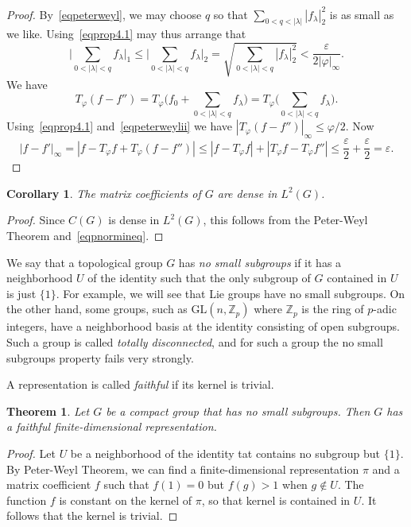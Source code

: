 \documentclass[12pt,reqno]{book}%
\newtheorem{theorem}{Theorem}[chapter]
\newtheorem{corollary}{Corollary}[chapter]
\theoremstyle{definition}
\theoremstyle{remark}
\theoremstyle{theorem}
\theoremstyle{remark}
\begin{document}
\begin{proof}
    By~\eqref{eqpeterweyl}, we may choose $q$ so that $\sum_{0 < q < |\lambda|} |f_\lambda|_{2}^{2}$ is as small as we like.
    Using~\eqref{eqprop4.1} may thus arrange that
    \begin{equation}\label{eqpeterweylii}
        \Bigg|\sum_{0 < |\lambda| < q} f_\lambda\Bigg|_1 \leq \Bigg|\sum_{0 < |\lambda| < q} f_\lambda \Bigg|_2 = \sqrt{\sum_{0 < |\lambda| < q} |f_\lambda|_{2}^{2}} < \frac{\varepsilon}{2|\varphi|_\infty}.
    \end{equation}
    We have
    \[
        T_\varphi(f - f'') = T_\varphi \Bigg(f_0 + \sum_{0 < |\lambda| < q} f_\lambda \Bigg) = T_\varphi \Bigg(\sum_{0 < |\lambda| < q} f_\lambda \Bigg).
    \]
    Using~\eqref{eqprop4.1} and~\eqref{eqpeterweylii} we have $|T_\varphi(f - f'')|_\infty \leq \varphi/2$.
    Now
    \[
        |f - f'|_\infty = |f - T_\varphi f + T_\varphi(f - f'')| \leq |f - T_\varphi f| + |T_\varphi f - T_\varphi f''| \leq \frac{\varepsilon}{2} + \frac{\varepsilon}{2} = \varepsilon.
    \]
\end{proof}%

\begin{corollary}\label{cor4.1}%
    The matrix  coefficients of $G$ are dense in $L^2(G)$.
\end{corollary}%
\begin{proof}%
    Since $C(G)$ is dense in $L^2(G)$, this follows from the Peter-Weyl Theorem and~\eqref{eqpnormineq}.
\end{proof}%

We say that a topological group $G$ has \emph{no small subgroups} if it has a neighborhood $U$ of the identity such that the only subgroup of $G$ contained in $U$ is just $\{1\}$.
For example, we will see that Lie groups have no small subgroups.
On the other hand, some groups, such as $\mathrm{GL}(n, \mathbb{Z}_p)$ where $\mathbb{Z}_p$ is the ring of $p$-adic integers, have a neighborhood basis at the identity consisting of open subgroups.
Such a group is called \emph{totally disconnected}, and for such a group the no small subgroups property fails very strongly.

A representation is called \emph{faithful} if its kernel is trivial.

\begin{theorem}\label{thm4.2}%
    Let $G$ be a compact group that has no small subgroups.
    Then $G$ has a faithful finite-dimensional representation.
\end{theorem}%
\begin{proof}%
    Let $U$ be a neighborhood of the identity tat contains no subgroup but $\{1\}$.
    By Peter-Weyl Theorem, we can find a finite-dimensional representation $\pi$ and a matrix coefficient $f$ such that $f(1) = 0$ but $f(g) > 1$ when $g \notin U$.
    The function $f$ is constant on the kernel of $\pi$, so that kernel is contained in $U$.
    It follows that the kernel is trivial.
\end{proof}%
\end{document}
